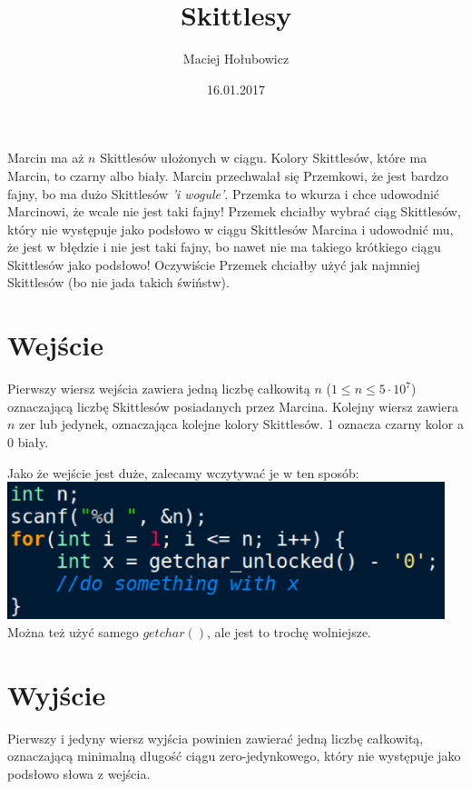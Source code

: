 \documentclass[zad,zawodnik,utf8]{sinol}
\title{Skittlesy}
\author{Maciej Hołubowicz} %
\date{16.01.2017}
\begin{document}
\begin{tasktext}%

Marcin ma aż $n$ Skittlesów ułożonych w ciągu. Kolory Skittlesów, które ma Marcin, to czarny albo biały. Marcin przechwalał się Przemkowi, że jest bardzo fajny, bo ma dużo Skittlesów {\it 'i wogule'}. Przemka to wkurza i chce udowodnić Marcinowi, że wcale nie jest taki fajny! Przemek chciałby wybrać ciąg Skittlesów, który nie występuje jako podsłowo w ciągu Skittlesów Marcina i udowodnić mu, że jest w błędzie i nie jest taki fajny, bo nawet nie ma takiego krótkiego ciągu Skittlesów jako podsłowo! Oczywiście Przemek chciałby użyć jak najmniej Skittlesów (bo nie jada takich świństw).

  \section{Wejście}
Pierwszy wiersz wejścia zawiera jedną liczbę całkowitą $n$ ($1 \leq n \le 5 \cdot 10^7$) oznaczającą liczbę Skittlesów posiadanych przez Marcina.
Kolejny wiersz zawiera $n$ zer lub jedynek, oznaczająca kolejne kolory Skittlesów. 1 oznacza czarny kolor a 0 biały.

\begin{center}
Jako że wejście jest duże, zalecamy wczytywać je w ten sposób:\\
\includegraphics[height=4cm]{rowski.eps}\\
Można też użyć samego $getchar()$, ale jest to trochę wolniejsze.
\end{center}

 \section{Wyjście}
Pierwszy i jedyny wiersz wyjścia powinien zawierać jedną liczbę całkowitą, oznaczającą minimalną długość ciągu zero-jedynkowego, który nie występuje jako podsłowo słowa z wejścia.

\makecompactexample

\end{tasktext}
\end{document}
